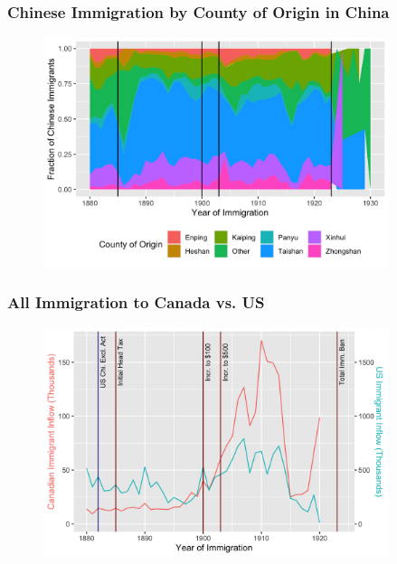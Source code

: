 \documentclass[pdf]{beamer}
\begin{document}
\begin{frame}[label = originchi]
	\frametitle{Chinese Immigration by County of Origin in China}
    \centering
	\begin{figure}[H]
		\begin{center}
			\includegraphics[width=0.9\textwidth]{../../figs/chiorig.png}
		\end{center}
	\end{figure}
    \hyperlink{events1912}{}
\end{frame}

\begin{frame}[label = yrimm_us]
	\frametitle{All Immigration to Canada vs. US}
    \centering
	\begin{figure}[H]
		\begin{center}
			\includegraphics[width=0.9\textwidth]{../../figs/yrimm_us.png}
		\end{center}
	\end{figure}
    \hyperlink{yrimmchius}{}
\end{frame}
\end{document}
